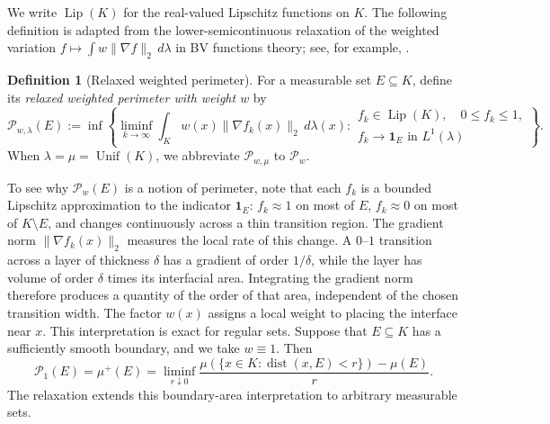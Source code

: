 \documentclass[11pt]{article}
\theoremstyle{definition}
\newtheorem{definition}[theorem]{Definition}
\theoremstyle{remark}
\newcommand{\Lip}{\operatorname{Lip}}
\newcommand{\cP}{\mathcal P}
\newcommand{\one}{\mathbf 1}
\newcommand{\Unif}{\operatorname{Unif}}
\begin{document}
We write \(\Lip(K)\) for the real-valued Lipschitz functions on \(K\).
The following definition is adapted from the lower-semicontinuous relaxation of the weighted variation $f\mapsto\int w\|\nabla f\|_2\,d\lambda$ in BV functions theory; see, for example, \cite{AFP}.
\begin{definition}[Relaxed weighted perimeter]\label{def:relax_weight_per}
For a measurable set \(E\subseteq K\), define its \emph{relaxed weighted
perimeter with weight \(w\)} by
\begin{equation}\label{eq:relaxed-perimeter}
 \cP_{w,\lambda}(E)
 :=
 \inf
 \left\{
 \liminf_{k\to\infty}
 \int_K
 w(x)\|\nabla f_k(x)\|_2\,d\lambda (x):
 \begin{array}{l}
 f_k\in\Lip(K),\quad 0\le f_k\le1,\\
 f_k\to\one_E\text{ in }L^1(\lambda)
 \end{array}
 \right\}.
\end{equation}
When $\lambda=\mu=\Unif(K)$, we abbreviate $\cP_{w,\mu}$ to $\cP_w$.
\end{definition}

To see why $\mathcal{P}_{w}(E)$ is a notion of perimeter, note that each \(f_k\) is a bounded Lipschitz approximation to the indicator \(\one_E\): \(f_k\approx 1\) on most of \(E\), \(f_k\approx 0\) on most of \(K\setminus E\), and changes continuously across a thin transition region.  The gradient norm \(\|\nabla f_k(x)\|_2\) measures the local rate of this change.  A $0$--$1$ transition across a layer of thickness \(\delta\) has a gradient of order \(1/\delta\), while the layer has volume of order \(\delta\) times its interfacial area.  Integrating the gradient norm therefore produces a quantity of the order of that area, independent of the chosen transition width.  The factor \(w(x)\) assigns a local weight to placing the interface near \(x\). This interpretation is exact for regular sets.  Suppose that \(E\subseteq K\) has a sufficiently smooth boundary, and we take $w\equiv 1$. Then
\[
 \cP_1(E)= \mu^+(E)=\liminf_{r\downarrow0}\frac{\mu\left(\{x\in K:\operatorname{dist}(x,E)<r\}\right)-\mu(E)}{r}.
\]
The relaxation extends this boundary-area interpretation to arbitrary measurable sets.  
\end{document}
